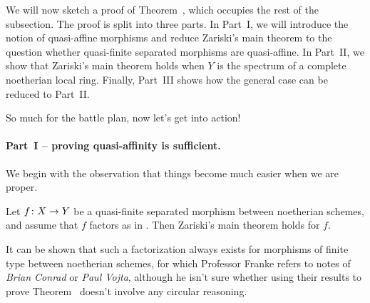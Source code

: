 \documentclass[a4paper,parskip=half,numbers=enddot, DIV=12]{scrreprt}
\begin{document}
	We will now sketch a proof of Theorem~, which occupies the rest of the subsection. The proof is split into three parts. In Part~I, we will introduce the notion of quasi-affine morphisms and reduce Zariski's main theorem to the question whether quasi-finite separated morphisms are quasi-affine. In Part~II, we show that Zariski's main theorem holds when $Y$ is the spectrum of a complete noetherian local ring. Finally, Part~III shows how the general case can be reduced to Part~II.
	
	So much for the battle plan, now let's get into action!
	
	\paragraph{Part~I -- proving quasi-affinity is sufficient.} We begin with the observation that things become much easier when we are proper.
	\begin{lem}
		Let $f\colon X\morphism Y$ be a quasi-finite separated morphism between noetherian schemes, and assume that $f$ factors as in . Then Zariski's main theorem holds for $f$.
	\end{lem}
\begin{rem}
	 It can be shown that such a factorization  always exists for morphisms of finite type between noetherian schemes, for which Professor Franke refers to notes of \emph{Brian Conrad} or \emph{Paul Vojta}, although he isn't sure whether using their results to prove Theorem~ doesn't involve any circular reasoning.
\end{rem}
\end{document}

